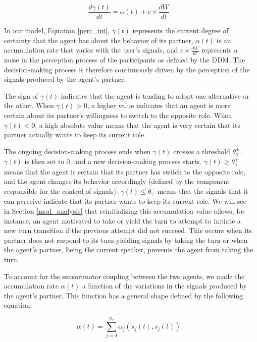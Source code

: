 \documentclass[twocolumn]{svjour3}
\begin{document}
\begin{equation}
  \frac{d\gamma(t)}{dt}=\alpha(t)+c\times\frac{dW}{dt}
  \label{perc_int}
\end{equation}

In our model, Equation \ref{perc_int}, $\gamma(t)$ represents the current degree of certainty that the agent has about the behavior of its partner, $\alpha(t)$ is an accumulation rate that varies with the user's signals, and $c\times\frac{dW}{dt}$ represents a noise in the perception process of the participants as defined by the DDM. The decision-making process is therefore continuously driven by the perception of the signals produced by the agent's partner.

The sign of $\gamma(t)$ indicates that the agent is tending to adopt one alternative or the other. 
When $\gamma(t)>0$, a higher value indicates that an agent is more certain about its partner's willingness to switch to the opposite role.
When $\gamma(t)<0$, a high absolute value means that the agent is very certain that its partner actually wants to keep its current role. 

The ongoing decision-making process ends when $\gamma(t)$ crosses a threshold $\theta_{\gamma}^{\pm}$. $\gamma(t)$ is then set to 0, and a new decision-making process starts.
$\gamma(t) \geq \theta_{\gamma}^{+}$ means that the agent is certain that its partner has switch to the opposite role, and the agent changes its behavior accordingly (defined by the component responsible for the control of signals). $\gamma(t) \leq \theta_{\gamma}^{-}$ means that the signals that it can perceive indicate that its partner wants to keep its current role. 
We will see in Section \ref{mod_analysis} that reinitializing this accumulation value allows, for instance, an agent motivated to take or yield the turn to attempt to initiate a new turn transition if the previous attempt did not succeed. 
This occurs when its partner does not respond to its turn-yielding signals by taking the turn  or when the agent's partner, being the current speaker, prevents the agent from taking the turn.

To account for the sensorimotor coupling between the two agents, we made the accumulation rate $\alpha(t)$ a function of the variations in the signals produced by the agent's partner. This function has a general shape defined by the following equation: 

\begin{equation}
  \alpha(t) = \sum_{j=0}^{n_{s}} \alpha_{j}(\dot{s}_j(t),s_j(t))
  \label{alpha_func}
\end{equation}
\end{document}
